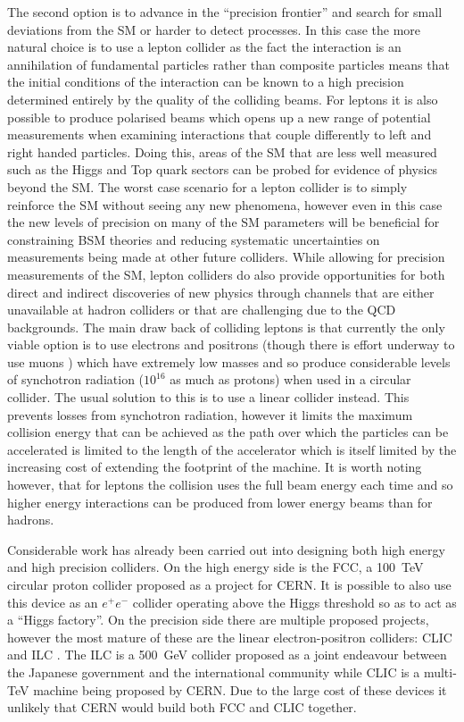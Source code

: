 The second option is to advance in the ``precision frontier'' and search for small deviations from the \ac{SM} or harder to detect processes. In this case the more natural choice is to use a lepton collider as the fact the interaction is an annihilation of fundamental particles rather than composite particles means that the initial conditions of the interaction can be known to a high precision determined entirely by the quality of the colliding beams. For leptons it is also possible to produce polarised beams which opens up a new range of potential measurements when examining interactions that couple differently to left and right handed particles. Doing this, areas of the \ac{SM} that are less well measured such as the Higgs and Top quark sectors can be probed for evidence of physics beyond the \ac{SM}. The worst case scenario for a lepton collider is to simply reinforce the \ac{SM} without seeing any new phenomena, however even in this case the new levels of precision on many of the \ac{SM} parameters will be beneficial for constraining \ac{BSM} theories and reducing systematic uncertainties on measurements being made at other future colliders. While allowing for precision measurements of the \ac{SM}, lepton colliders do also provide opportunities for both direct and indirect discoveries of new physics through channels that are either unavailable at hadron colliders or that are challenging due to the \ac{QCD} backgrounds. The main draw back of colliding leptons is that currently the only viable option is to use electrons and positrons (though there is effort underway to use muons \cite{Bogomilov:2017vwz}) which have extremely low masses and so produce considerable levels of synchotron radiation (${10^{16}}$ as much as protons) when used in a circular collider. The usual solution to this is to use a linear collider instead. This prevents losses from synchotron radiation, however it limits the maximum collision energy that can be achieved as the path over which the particles can be accelerated is limited to the length of the accelerator which is itself limited by the increasing cost of extending the footprint of the machine. It is worth noting however, that for leptons the collision uses the full beam energy each time and so higher energy interactions can be produced from lower energy beams than for hadrons.

Considerable work has already been carried out into designing both high energy and high precision colliders. On the high energy side is the \ac{FCC}, a 100~TeV circular proton collider proposed as a project for \ac{CERN}. It is possible to also use this device as an $e^+e^-$ collider operating above the Higgs threshold so as to act as a ``Higgs factory''. On the precision side there are multiple proposed projects, however the most mature of these are the linear electron-positron colliders: \ac{CLIC} \cite{CLIC:2016zwp} and \ac{ILC} \cite{Behnke:2013xla}. The \ac{ILC} is a 500~GeV collider proposed as a joint endeavour between the Japanese government and the international community while \ac{CLIC} is a multi-TeV machine being proposed by \ac{CERN}. Due to the large cost of these devices it unlikely that \ac{CERN} would build both \ac{FCC} and \ac{CLIC} together.

